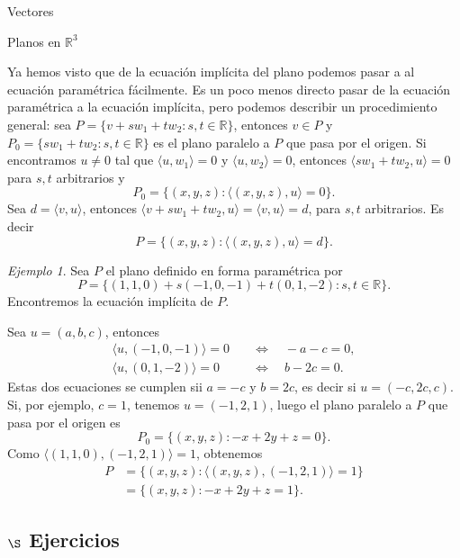 \documentclass[a4paper,12pt,twoside,spanish,reqno]{amsbook}
\numberwithin{equation}{section}
\theoremstyle{definition}
\theoremstyle{remark}
\newtheorem*{ejemplo*}{Ejemplo}
\newcommand{\la}{\langle}
\newcommand{\ra}{\rangle}
\newcommand{\R}{\mathbb R}
\begin{document}
\begin{chapter}{Vectores}
\begin{section}{Planos en $\R^3$}
    
    Ya  hemos visto que de la ecuación implícita del plano podemos pasar a al ecuación paramétrica fácilmente. Es un poco menos directo pasar de la ecuación paramétrica a la ecuación implícita, pero podemos describir un procedimiento general: sea $P = \{v + sw_1 + tw_2: s,t \in \R\}$,  entonces $v \in P$ y $P_0 = \{sw_1 + tw_2: s,t \in \R\}$  es el plano paralelo a $P$  que pasa por el origen. Si encontramos $u \ne 0$ tal que $\la u,w_1 \ra =0$ y $\la u,w_2 \ra =0$, entonces $ \la  sw_1 + tw_2, u \ra =0$ para  $s,t$ arbitrarios y 
    \begin{equation*}
    P_0 = \{(x,y,z): \la (x,y,z),u \ra =0\}. 
    \end{equation*}
    Sea $d = \la v, u \ra$, entonces $\la v + sw_1 + tw_2, u\ra = \la v , u\ra =d$, para $s,t$ arbitrarios. Es decir
    \begin{equation*}
    P = \{(x,y,z): \la (x,y,z),u \ra =d\}. 
    \end{equation*}
      
    \begin{ejemplo*}
        Sea $P$ el plano definido en forma paramétrica por 
        \begin{equation*}
            P = \{ (1,1,0) + s(-1,0,-1) + t(0,1,-2): s,t \in \R\}.
        \end{equation*}
         Encontremos la ecuación implícita de  $P$. 
         
         Sea $u= (a,b,c)$,  entonces 
        \begin{align*}
            \la u,(-1,0,-1) \ra = 0 \quad &\Leftrightarrow \quad -a -c=0, \\
            \la u,(0,1,-2) \ra = 0 \quad &\Leftrightarrow \quad b -2c=0.
        \end{align*} 
        Estas dos ecuaciones se cumplen sii $a = -c$ y $b=2c$, es decir si $u=(-c,2c,c)$. Si, por ejemplo, $c=1$, tenemos $u=(-1,2,1)$, luego el plano paralelo a $P$  que pasa por el origen es
        \begin{equation*}
        P_0 = \{(x,y,z): -x+2y+z =0\}. 
        \end{equation*}
        Como $\la (1,1,0),(-1,2,1) \ra = 1 $, obtenemos
        \begin{align*}
        P &= \{(x,y,z): \la (x,y,z),(-1,2,1) \ra =1\} \\
        &= \{(x,y,z): -x+2y+z =1\}.
        \end{align*}
    \end{ejemplo*}

    \subsection*{\Large $\S$ Ejercicios}
    

\end{section}
\end{chapter}
\end{document}
